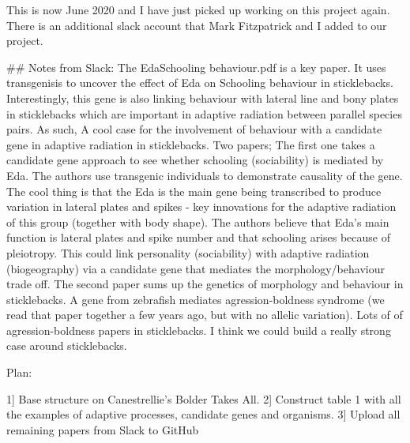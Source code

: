 \documentclass[11pt]{article}
\begin{document}
This is now June 2020 and I have just picked up working on this project again. There is an additional slack account that Mark Fitzpatrick and I added to our project.

## Notes from Slack: The EdaSchooling behaviour.pdf is a key paper. It uses transgenisis to uncover the effect of Eda on Schooling behaviour in sticklebacks. Interestingly, this gene is also linking behaviour with lateral line and bony plates in sticklebacks which are important in adaptive radiation between parallel species pairs. As such, A cool case for the involvement of behaviour with a candidate gene in adaptive radiation in sticklebacks. Two papers; The first one takes a candidate gene approach to see whether schooling (sociability) is mediated by Eda. The authors use transgenic individuals to demonstrate causality of the gene. The cool thing is that the Eda is the main gene being transcribed to produce variation in lateral plates and spikes - key innovations for the adaptive radiation of this group (together with body shape). The authors believe that Eda's main function is lateral plates and spike number and that schooling arises because of pleiotropy. This could link personality (sociability) with adaptive radiation (biogeography) via a candidate gene that mediates the morphology/behaviour trade off. The second paper sums up the genetics of morphology and behaviour in sticklebacks. A gene from zebrafish mediates agression-boldness syndrome (we read that paper together a few years ago, but with no allelic variation). Lots of of agression-boldness papers in sticklebacks. I think we could build a really strong case around sticklebacks.


Plan:

1] Base structure on Canestrellie's Bolder Takes All.
2] Construct table 1 with all the examples of adaptive processes, candidate genes and organisms.
3] Upload all remaining papers from Slack to GitHub    
\end{document}

